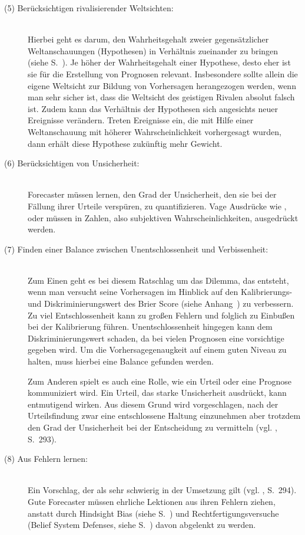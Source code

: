 \begin{description}
\item[(5) Berücksichtigen rivalisierender Weltsichten:] \hfill \\
Hierbei geht es darum, den Wahrheitsgehalt zweier gegensätzlicher Weltanschauungen (Hypothesen) in Verhältnis zueinander zu bringen (siehe S.~\xcom).
Je höher der Wahrheitsgehalt einer Hypothese, desto eher ist sie für die Erstellung von Prognosen relevant. Insbesondere
sollte allein die eigene Weltsicht zur Bildung von Vorhersagen herangezogen werden, wenn man sehr sicher ist, dass die Weltsicht des
geistigen Rivalen absolut falsch ist. Zudem kann das Verhältnis der Hypothesen sich angesichts neuer Ereignisse verändern.
Treten Ereignisse ein, die mit Hilfe einer Weltanschauung mit höherer Wahrscheinlichkeit vorhergesagt wurden, dann erhält diese
Hypothese zukünftig mehr Gewicht.

\item[(6) Berücksichtigen von Unsicherheit:] \hfill \\
Forecaster müssen lernen, den Grad der Unsicherheit, den sie bei der Fällung ihrer Urteile verspüren, zu quantifizieren.
Vage Ausdrücke wie \grqq{}, \grqq{} oder \grqq{} müssen in
Zahlen, also subjektiven Wahrscheinlichkeiten, ausgedrückt werden.

\item[(7) Finden einer Balance zwischen Unentschlossenheit und Verbissenheit:] \hfill \\
Zum Einen geht es bei diesem Ratschlag um das Dilemma, das entsteht, wenn man versucht seine Vorhersagen im Hinblick auf
den Kalibrierungs- und Diskriminierungswert des Brier Score (siehe Anhang~\xcom) zu verbessern. Zu viel Entschlossenheit
kann zu großen Fehlern und folglich zu Einbußen bei der Kalibrierung führen. Unentschlossenheit hingegen kann dem
Diskriminierungswert schaden, da bei vielen Prognosen eine vorsichtige \grqq{} gegeben wird. Um
die Vorhersagegenaugkeit auf einem guten Niveau zu halten, muss hierbei eine Balance gefunden werden.

Zum Anderen spielt es auch eine Rolle, wie ein Urteil oder eine Prognose kommuniziert wird. Ein Urteil, das starke
Unsicherheit ausdrückt, kann entmutigend wirken. Aus diesem Grund wird vorgeschlagen, nach der Urteilsfindung zwar
eine entschlossene Haltung einzunehmen aber trotzdem den Grad der Unsicherheit bei der Entscheidung zu vermitteln
(vgl. \cite{Jackson}, S.~293).

\item[(8) Aus Fehlern lernen:] \hfill \\
Ein Vorschlag, der als sehr schwierig in der Umsetzung gilt (vgl. \cite{Jackson}, S.~294). Gute Forecaster müssen
ehrliche Lektionen aus ihren Fehlern ziehen, anstatt durch Hindsight Bias (siehe S.~\xcom) und Rechtfertigungsversuche
(Belief System Defenses, siehe S.~\xcom) davon abgelenkt zu werden.


\end{description}
